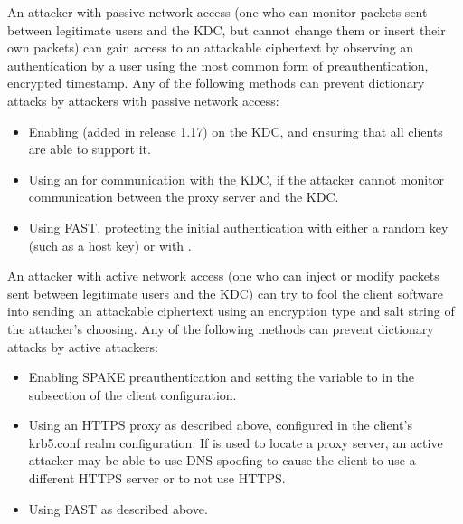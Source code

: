 \documentclass[letterpaper,10pt,english]{sphinxmanual}
\begin{document}
An attacker with passive network access (one who can monitor packets
sent between legitimate users and the KDC, but cannot change them or
insert their own packets) can gain access to an attackable ciphertext
by observing an authentication by a user using the most common form of
preauthentication, encrypted timestamp.  Any of the following methods
can prevent dictionary attacks by attackers with passive network
access:
\begin{itemize}
\item {} 
Enabling {\hyperref[\detokenize{admin/spake:spake}]{}} (added in release
1.17) on the KDC, and ensuring that all clients are able to support
it.

\item {} 
Using an {\hyperref[\detokenize{admin/https:https}]{}} for communication with the KDC,
if the attacker cannot monitor communication between the proxy
server and the KDC.

\item {} 
Using FAST, protecting the initial authentication with either a
random key (such as a host key) or with {\hyperref[\detokenize{admin/pkinit:anonymous-pkinit}]{}}.

\end{itemize}

An attacker with active network access (one who can inject or modify
packets sent between legitimate users and the KDC) can try to fool the
client software into sending an attackable ciphertext using an
encryption type and salt string of the attacker’s choosing.  Any of the
following methods can prevent dictionary attacks by active attackers:
\begin{itemize}
\item {} 
Enabling SPAKE preauthentication and setting the
 variable to  in the
{\hyperref[\detokenize{admin/conf_files/krb5_conf:realms}]{}} subsection of the client configuration.

\item {} 
Using an HTTPS proxy as described above, configured in the client’s
krb5.conf realm configuration.  If {\hyperref[\detokenize{admin/realm_config:kdc-discovery}]{}} is used to locate a proxy server, an active
attacker may be able to use DNS spoofing to cause the client to use
a different HTTPS server or to not use HTTPS.

\item {} 
Using FAST as described above.

\end{itemize}
\end{document}
